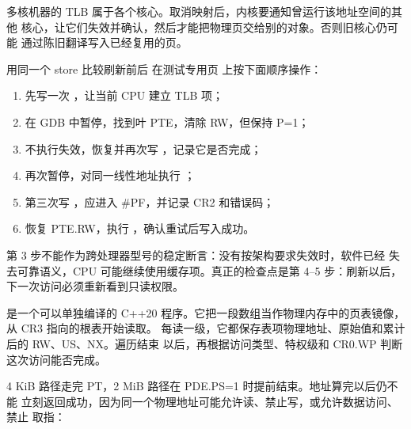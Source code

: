 多核机器的 TLB 属于各个核心。取消映射后，内核要通知曾运行该地址空间的其他
核心，让它们失效并确认，然后才能把物理页交给别的对象。否则旧核心仍可能
通过陈旧翻译写入已经复用的页。

\begin{experimentbox}{用同一个 store 比较刷新前后}
在测试专用页  上按下面顺序操作：

\begin{enumerate}[leftmargin=2.2em]
  \item 先写一次 ，让当前 CPU 建立 TLB 项；
  \item 在 GDB 中暂停，找到叶 PTE，清除 RW，但保持 P=1；
  \item 不执行失效，恢复并再次写 ，记录它是否完成；
  \item 再次暂停，对同一线性地址执行 ；
  \item 第三次写 ，应进入 \#PF，并记录 CR2 和错误码；
  \item 恢复 PTE.RW，执行 ，确认重试后写入成功。
\end{enumerate}

第 3 步不能作为跨处理器型号的稳定断言：没有按架构要求失效时，软件已经
失去可靠语义，CPU 可能继续使用缓存项。真正的检查点是第 4--5 步：刷新以后，
下一次访问必须重新看到只读权限。
\end{experimentbox}


 是一个可以单独编译的 C++20
程序。它把一段数组当作物理内存中的页表镜像，从 CR3 指向的根表开始读取。
每读一级，它都保存表项物理地址、原始值和累计后的 RW、US、NX。遍历结束
以后，再根据访问类型、特权级和 CR0.WP 判断这次访问能否完成。



4 KiB 路径走完 PT，2 MiB 路径在 PDE.PS=1 时提前结束。地址算完以后仍不能
立刻返回成功，因为同一个物理地址可能允许读、禁止写，或允许数据访问、禁止
取指：



